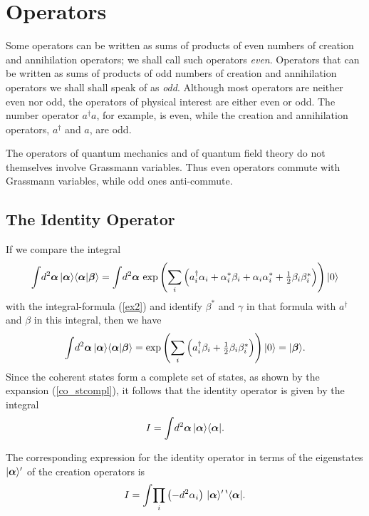 \documentclass[12pt]{article}
\def\beq{\begin{equation}}
\def\eeq{\end{equation}}
\def\a{\alpha}
\def\ba{{\mbox{\boldmath$\alpha$}}}
\def\sa{\alpha^*}
\def\ad{a^\dgr}
\def\b{\beta}
\def\bb{{\mbox{\boldmath$\beta$}}}
\def\sb{\beta^*}
\def\c{\gamma}
\def\dgr{\dagger}
\def\thalf{\textstyle{ {1 \over 2} } }
\def\eiss{eigenstates }
\def\op{operator }
\def\ops{operators }
\def\opsp{operators}
\def\ani{annihilation }
\def\cre{creation }
\begin{document}
\section{Operators}
Some operators can be written as sums of products 
of even numbers of \cre and \ani \opsp;
we shall call such
operators \emph{even}.
Operators that can be written as sums of products 
of odd numbers of \cre and \ani \opsp
we shall shall speak of as \emph{odd}.
Although most operators are neither even nor odd,
the operators of physical interest are either
even or odd.
The number \op $ \ad a $, for example,
is even, while the \cre and \ani \opsp, $ \ad $ and $ a $,
are odd. 
\par
The operators of quantum mechanics
and of quantum field theory
do not themselves involve Grassmann variables.
Thus even operators commute with
Grassmann variables, 
while odd ones anti-commute.

\subsection{The Identity Operator}
If we compare the integral
\beq
\int \! d^2\ba \, | \ba \rangle \langle \ba | \bb \rangle 
= \int \! d^2\ba \, \exp \left( \sum_i \left(
\ad_i \a_i + \sa_i \b_i + \a_i \sa_i 
+ \thalf \b_i \sb_i \right) \right) | 0 \rangle
\label {id1}
\eeq 
with the integral-formula (\ref {ex2})
and identify $ \sb $ and $ \c $ in that formula
with $ \ad $ and $ \b $ in this integral,
then we have
\beq
\int \! d^2\ba \, | \ba \rangle \langle \ba | \bb \rangle
= \exp \left( \sum_i \left(
\ad_i \b_i + \thalf \b_i \sb_i \right) \right) | 0 \rangle
= | \bb \rangle .
\label {id2}
\eeq
Since the coherent states form a complete set
of states, as shown by the expansion (\ref {co_stcompl}),
it follows that
the identity operator is given by the integral
\beq
I = \int \! d^2 \ba \, | \ba \rangle \langle \ba | .
\label {I}
\eeq 
\par
The corresponding expression for the identity operator
in terms of the \eiss $ | \ba \rangle^\prime $
of the \cre \ops is 
\beq
I = \int \! \prod_i \left( - d^2 \a_i \right) \, 
| \ba \rangle^\prime \, ^\backprime\langle \ba | .
\label {I'}
\eeq
\end{document}
